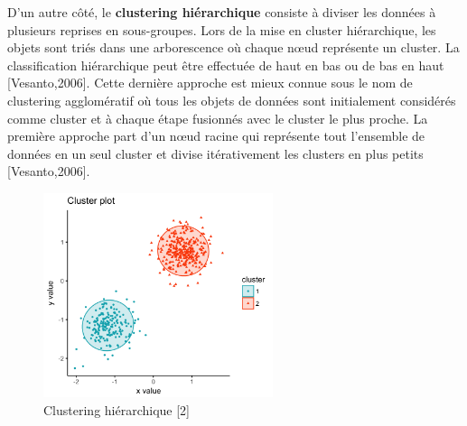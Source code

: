 \documentclass[12pt]{article}
\begin{document}
{D'un autre côté, le \textbf{clustering hiérarchique} consiste à diviser les données à plusieurs reprises en sous-groupes. Lors de la mise en cluster hiérarchique, les objets sont triés dans une arborescence où chaque nœud représente un cluster. La classification hiérarchique peut être effectuée de haut en bas ou de bas en haut {\color{red}[Vesanto,2006]}. Cette dernière approche est mieux connue sous le nom de clustering agglomératif où tous les objets de données sont initialement considérés comme cluster et à chaque étape fusionnés avec le cluster le plus proche. La première approche part d'un nœud racine qui représente tout l'ensemble de données en un seul cluster et divise itérativement les clusters en plus petits {\color{red}[Vesanto,2006]}.


\begin{figure}[H]
	\centering
    \includegraphics[width=0.6\textwidth]{image6.png}
     \caption{ Clustering hiérarchique [2]}
    \label{fig:6}
\end{figure}


}
\end{document}
